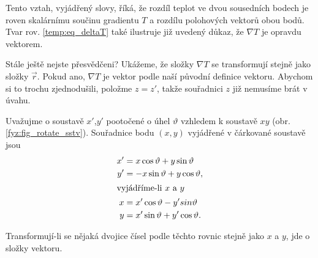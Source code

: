     Tento vztah, vyjádřený slovy, říká, že rozdíl teplot ve dvou sousedních bodech je roven 
    skalárnímu součinu gradientu $T$ a rozdílu polohových vektorů obou bodů. Tvar rov. 
    \ref{temp:eq_deltaT} také ilustruje již uvedený důkaz, že  $\nabla T$ je opravdu vektorem.

    Stále ještě nejste přesvědčeni? Ukážeme, že složky $\nabla T$ se transformují stejně jako složky 
    $\vec{r}$. Pokud ano, $\nabla T$ je vektor podle naší původní definice vektoru. Abychom si to 
    trochu zjednodušili, položme $z=z'$, takže souřadnici $z$ již nemusíme brát v úvahu.

    Uvažujme o soustavě $x'$,$y'$ pootočené o úhel $\vartheta$  vzhledem k soustavě $xy$ (obr.
    \ref{fyz:fig_rotate_sstv}). Souřadnice bodu $(x,y)$ vyjádřené v čárkované soustavě jsou
    \begin{align}
      x' &=  x\cos\vartheta+y\sin\vartheta   \nonumber           \\
      y' &= -x\sin\vartheta+y\cos\vartheta,  \nonumber           \\ 
      \shortintertext{vyjádříme-li $x$ a $y$}
      x &= x'\cos\vartheta-y'sin\vartheta    \label{fyz:eq_x_ova}\\
      y &= x'\sin\vartheta+y'\cos\vartheta.  \nonumber
    \end{align}

    Transformují-li se nějaká dvojice čísel podle těchto rovnic stejně jako $x$ a $y$, jde o složky vektoru.

